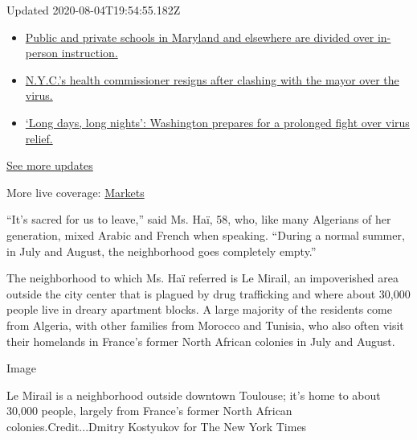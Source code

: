 Updated 2020-08-04T19:54:55.182Z

\begin{itemize}
\tightlist
\item
  \href{https://www.nytimes3xbfgragh.onion/2020/08/04/world/coronavirus-cases.html?action=click\&pgtype=Article\&state=default\&region=MAIN_CONTENT_1\&context=storylines_live_updates\#link-4825b93}{Public
  and private schools in Maryland and elsewhere are divided over
  in-person instruction.}
\item
  \href{https://www.nytimes3xbfgragh.onion/2020/08/04/world/coronavirus-cases.html?action=click\&pgtype=Article\&state=default\&region=MAIN_CONTENT_1\&context=storylines_live_updates\#link-4d1eafa8}{N.Y.C.'s
  health commissioner resigns after clashing with the mayor over the
  virus.}
\item
  \href{https://www.nytimes3xbfgragh.onion/2020/08/04/world/coronavirus-cases.html?action=click\&pgtype=Article\&state=default\&region=MAIN_CONTENT_1\&context=storylines_live_updates\#link-6b644638}{`Long
  days, long nights': Washington prepares for a prolonged fight over
  virus relief.}
\end{itemize}

\href{https://www.nytimes3xbfgragh.onion/2020/08/04/world/coronavirus-cases.html?action=click\&pgtype=Article\&state=default\&region=MAIN_CONTENT_1\&context=storylines_live_updates}{See
more updates}

More live coverage:
\href{https://www.nytimes3xbfgragh.onion/live/2020/08/04/business/stock-market-today-coronavirus?action=click\&pgtype=Article\&state=default\&region=MAIN_CONTENT_1\&context=storylines_live_updates}{Markets}

``It's sacred for us to leave,'' said Ms. Haï, 58, who, like many
Algerians of her generation, mixed Arabic and French when speaking.
``During a normal summer, in July and August, the neighborhood goes
completely empty.''

The neighborhood to which Ms. Haï referred is Le Mirail, an impoverished
area outside the city center that is plagued by drug trafficking and
where about 30,000 people live in dreary apartment blocks. A large
majority of the residents come from Algeria, with other families from
Morocco and Tunisia, who also often visit their homelands in France's
former North African colonies in July and August.

Image

Le Mirail is a neighborhood outside downtown Toulouse; it's home to
about 30,000 people, largely from France's former North African
colonies.Credit...Dmitry Kostyukov for The New York Times

